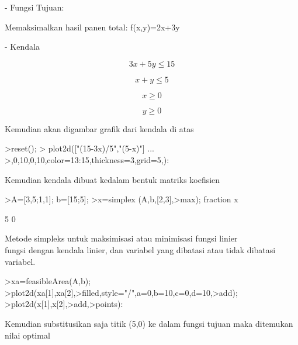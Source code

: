 \documentclass{article}
\begin{document}
\begin{eulernotebook}
\begin{eulercomment}
\begin{eulercomment}
\begin{eulercomment}
\begin{eulercomment}
\begin{eulercomment}
- Fungsi Tujuan:\\
\end{eulercomment}
\begin{eulerttcomment}
  Memaksimalkan hasil panen total: f(x,y)=2x+3y
\end{eulerttcomment}
\begin{eulercomment}

- Kendala\\
\end{eulercomment}
\begin{eulerformula}
\[
3x+5y\le 15
\]
\end{eulerformula}
\begin{eulerformula}
\[
x+y\le 5
\]
\end{eulerformula}
\begin{eulerformula}
\[
x\ge 0
\]
\end{eulerformula}
\begin{eulerformula}
\[
y\ge 0
\]
\end{eulerformula}
\begin{eulercomment}
Kemudian akan digambar grafik dari kendala di atas


\end{eulercomment}
\begin{eulerprompt}
>reset();
> plot2d(["(15-3x)/5","(5-x)"] ...
>,0,10,0,10,color=13:15,thickness=3,grid=5,):
\end{eulerprompt}
\begin{eulercomment}
Kemudian kendala dibuat kedalam bentuk matriks koefisien
\end{eulercomment}
\begin{eulerprompt}
>A=[3,5;1,1]; b=[15;5];
>x=simplex (A,b,[2,3],>max); fraction x
\end{eulerprompt}
\begin{euleroutput}
          5 
          0 
\end{euleroutput}
\begin{eulercomment}
Metode simpleks untuk maksimisasi atau minimisasi fungsi linier\\
fungsi dengan kendala linier, dan variabel yang dibatasi atau tidak
dibatasi variabel. 
\end{eulercomment}
\begin{eulerprompt}
>xa=feasibleArea(A,b);
>plot2d(xa[1],xa[2],>filled,style="/",a=0,b=10,c=0,d=10,>add);
>plot2d(x[1],x[2],>add,>points):
\end{eulerprompt}
\begin{eulercomment}
Kemudian substitusikan saja titik (5,0) ke dalam fungsi tujuan maka
ditemukan nilai optimal


\end{eulercomment}
\end{eulercomment}
\end{eulercomment}
\end{eulercomment}
\end{eulercomment}
\end{eulernotebook}
\end{document}
